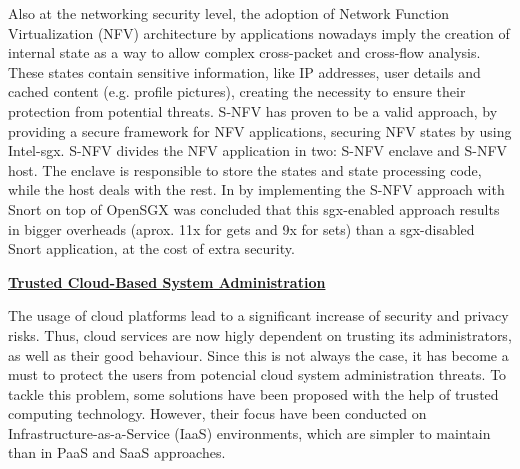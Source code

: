 Also at the networking security level, the adoption of Network Function Virtualization (NFV) architecture by applications nowadays imply the creation of internal state as a way to allow complex cross-packet and cross-flow analysis. 
These states contain sensitive information, like IP addresses, user details and cached content (e.g. profile pictures), creating the necessity to ensure their protection from potential threats.
S-NFV \cite{sNFVPaper} has proven to be a valid approach, by providing a secure framework for NFV applications, securing NFV states by using Intel-\gls{sgx}.
S-NFV divides the NFV application in two: S-NFV enclave and S-NFV host. The enclave is responsible to store the states and state processing code, while the host deals with the rest.
In \cite{sNFVPaper} by implementing the S-NFV approach with Snort \cite{snortPaper} on top of OpenSGX was
concluded that this \gls{sgx}-enabled approach results in bigger overheads (aprox. 11x for
gets and 9x for sets) than a \gls{sgx}-disabled Snort application, at the cost of extra security.\newline


\underline{\textbf{Trusted Cloud-Based System Administration}}

The usage of cloud platforms lead to a significant increase of security and privacy risks. Thus, cloud services are now higly dependent on trusting its administrators, as well as their good behaviour. Since this is not always the case, it has become a must to protect the users from potencial cloud system administration threats. 
To tackle this problem, some solutions have been proposed with the help of trusted computing technology. However, their focus have been conducted on Infrastructure-as-a-Service (IaaS) environments, which are simpler to maintain than in PaaS and SaaS approaches.


